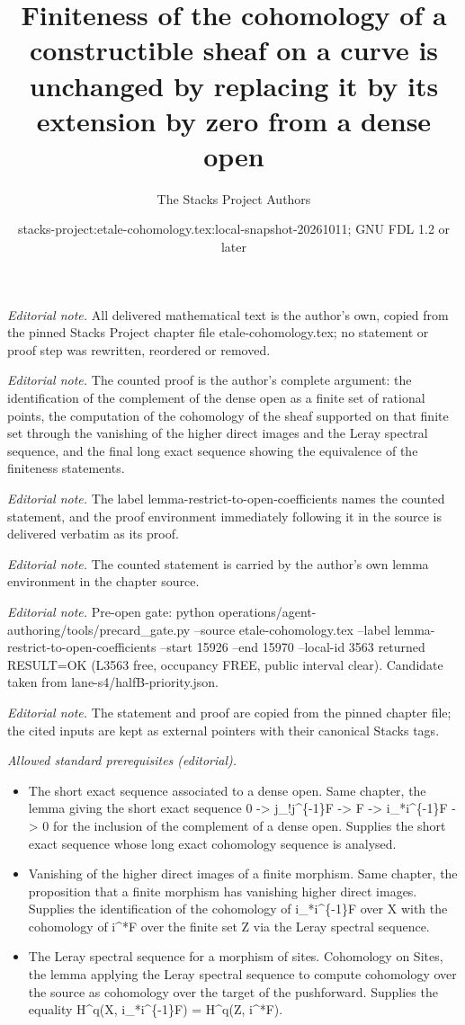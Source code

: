 \documentclass[10pt,a4paper]{amsart}
\title{Finiteness of the cohomology of a constructible sheaf on a curve is unchanged by replacing it by its extension by zero from a dense open}
\author{The Stacks Project Authors}
\date{stacks-project:etale-cohomology.tex:local-snapshot-20261011; GNU FDL 1.2 or later}
\theoremstyle{plain}
\theoremstyle{definition}
\theoremstyle{remark}
\numberwithin{equation}{subsection}
\begin{document}
\maketitle
\noindent\textit{Editorial note.} All delivered mathematical text is the author's own, copied from the pinned Stacks Project chapter file etale-cohomology.tex; no statement or proof step was rewritten, reordered or removed.\par\medskip
\noindent\textit{Editorial note.} The counted proof is the author's complete argument: the identification of the complement of the dense open as a finite set of rational points, the computation of the cohomology of the sheaf supported on that finite set through the vanishing of the higher direct images and the Leray spectral sequence, and the final long exact sequence showing the equivalence of the finiteness statements.\par\medskip
\noindent\textit{Editorial note.} The label lemma-restrict-to-open-coefficients names the counted statement, and the proof environment immediately following it in the source is delivered verbatim as its proof.\par\medskip
\noindent\textit{Editorial note.} The counted statement is carried by the author's own lemma environment in the chapter source.\par\medskip
\noindent\textit{Editorial note.} Pre-open gate: python operations/agent-authoring/tools/precard\_gate.py --source etale-cohomology.tex --label lemma-restrict-to-open-coefficients --start 15926 --end 15970 --local-id 3563 returned RESULT=OK (L3563 free, occupancy FREE, public interval clear). Candidate taken from lane-s4/halfB-priority.json.\par\medskip
\noindent\textit{Editorial note.} The statement and proof are copied from the pinned chapter file; the cited inputs are kept as external pointers with their canonical Stacks tags.\par\medskip
\noindent\textit{Allowed standard prerequisites (editorial).}\begin{itemize}
\item The short exact sequence associated to a dense open. Same chapter, the lemma giving the short exact sequence 0 -> j\_!j\textasciicircum{}\{-1\}F -> F -> i\_*i\textasciicircum{}\{-1\}F -> 0 for the inclusion of the complement of a dense open. Supplies the short exact sequence whose long exact cohomology sequence is analysed.
\item Vanishing of the higher direct images of a finite morphism. Same chapter, the proposition that a finite morphism has vanishing higher direct images. Supplies the identification of the cohomology of i\_*i\textasciicircum{}\{-1\}F over X with the cohomology of i\textasciicircum{}*F over the finite set Z via the Leray spectral sequence.
\item The Leray spectral sequence for a morphism of sites. Cohomology on Sites, the lemma applying the Leray spectral sequence to compute cohomology over the source as cohomology over the target of the pushforward. Supplies the equality H\textasciicircum{}q(X, i\_*i\textasciicircum{}\{-1\}F) = H\textasciicircum{}q(Z, i\textasciicircum{}*F).
\end{itemize}\medskip
\end{document}
